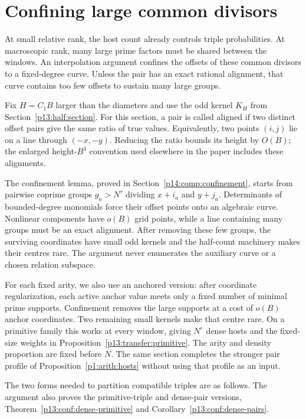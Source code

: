 \section{Confining large common divisors}
\label{p13:conf:section}

At small relative rank, the host count already controls
triple probabilities. At macroscopic rank, many large
prime factors must be shared between the windows.
An interpolation argument confines the offsets of these
common divisors to a fixed-degree curve. Unless the pair
has an exact rational alignment, that curve contains too
few offsets to sustain many large groups.

Fix \(H=C_1B\) larger than the diameters and use the odd
kernel \(K_H\) from Section~\ref{p13:half:section}.
For this section, a pair is called aligned if two distinct
offset pairs give the same ratio of true values.
Equivalently, two points \((i,j)\) lie on a line through
\((-x,-y)\). Reducing the ratio bounds its height by
\(O(B)\); the enlarged height-\(B^3\) convention used
elsewhere in the paper includes these alignments.


The confinement lemma, proved in Section~\ref{p14:comp:confinement},
starts from pairwise coprime groups $g_a>N^\tau$ dividing
$x+i_a$ and $y+j_a$.  Determinants of bounded-degree monomials force
their offset points onto an algebraic curve.  Nonlinear components
have $o(B)$ grid points, while a line containing many groups must be
an exact alignment.  After removing these few groups, the surviving
coordinates have small odd kernels and the half-count machinery makes
their centres rare.  The argument never enumerates the auxiliary curve
or a chosen relation subspace.

For each fixed arity, we also use an anchored version:
after coordinate regularization, each active anchor value meets only
a fixed number of minimal prime supports. Confinement removes the
large supports at a cost of $o(B)$ anchor coordinates. Two remaining
small kernels make that centre rare. On a primitive family this
works at every window, giving $N^\varepsilon$ dense hosts and the
fixed-size weights in Proposition~\ref{p13:transfer:primitive}.
The arity and density proportion are fixed before $N$.
The same section completes the stronger pair profile of
Proposition~\ref{p1:arith:hosts} without using that profile as an input.

The two forms needed to partition compatible triples are as follows.
The argument also proves the primitive-triple and dense-pair versions,
Theorem~\ref{p13:conf:dense-primitive} and
Corollary~\ref{p13:conf:dense-pairs}.

